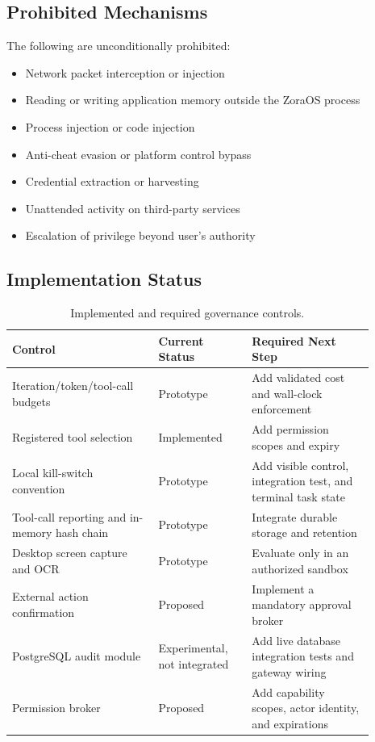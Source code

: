 \documentclass[11pt]{article}
\begin{document}
\subsection{Prohibited Mechanisms}

The following are unconditionally prohibited:
\begin{itemize}[leftmargin=*]
  \item Network packet interception or injection
  \item Reading or writing application memory outside the ZoraOS process
  \item Process injection or code injection
  \item Anti-cheat evasion or platform control bypass
  \item Credential extraction or harvesting
  \item Unattended activity on third-party services
  \item Escalation of privilege beyond user's authority
\end{itemize}

\subsection{Implementation Status}

\begin{table}[ht]
\centering
\caption{Implemented and required governance controls.}
\label{tab:controls}
\begin{tabular}{p{0.36\linewidth}p{0.23\linewidth}p{0.30\linewidth}}
\toprule
\textbf{Control} & \textbf{Current Status} & \textbf{Required Next Step} \\
\midrule
Iteration/token/tool-call budgets & Prototype & Add validated cost and wall-clock enforcement \\
Registered tool selection & Implemented & Add permission scopes and expiry \\
Local kill-switch convention & Prototype & Add visible control, integration test, and terminal task state \\
Tool-call reporting and in-memory hash chain & Prototype & Integrate durable storage and retention \\
Desktop screen capture and OCR & Prototype & Evaluate only in an authorized sandbox \\
External action confirmation & Proposed & Implement a mandatory approval broker \\
PostgreSQL audit module & Experimental, not integrated & Add live database integration tests and gateway wiring \\
Permission broker & Proposed & Add capability scopes, actor identity, and expirations \\
\bottomrule
\end{tabular}
\end{table}
\end{document}
